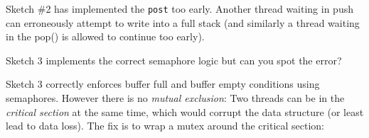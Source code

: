 Sketch \#2 has implemented the \texttt{post} too early. Another thread
waiting in push can erroneously attempt to write into a full stack (and
similarly a thread waiting in the pop() is allowed to continue too
early).

\begin{Shaded}
\begin{Highlighting}[]
 
   
\NormalTok{\}}
  
\NormalTok{\}}
\end{Highlighting}
\end{Shaded}

Sketch 3 implements the correct semaphore logic but can you spot the
error?

\begin{Shaded}
\begin{Highlighting}[]
 
   
   
\NormalTok{\}}

  
\NormalTok{\}}
\end{Highlighting}
\end{Shaded}

Sketch 3 correctly enforces buffer full and buffer empty conditions
using semaphores. However there is no \emph{mutual exclusion}: Two
threads can be in the \emph{critical section} at the same time, which
would corrupt the data structure (or least lead to data loss). The fix
is to wrap a mutex around the critical section:

